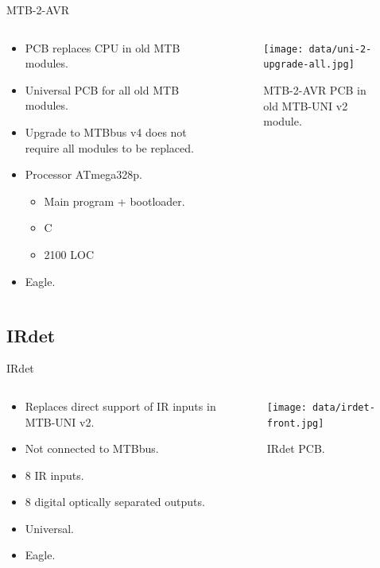\documentclass[aspectratio=169]{beamer}
\begin{document}
\begin{frame}{MTB-2-AVR}
\begin{columns}
	\begin{column}{.5\textwidth}
		\begin{itemize}
		\item PCB replaces CPU in old MTB modules.
		\item Universal PCB for all old MTB modules.
		\item Upgrade to MTBbus v4 does not require all modules to be replaced.
		\item Processor ATmega328p.
		\begin{itemize}
			\item Main program + bootloader.
			\item C
			\item 2100 LOC
		\end{itemize}
		\item Eagle.
		\end{itemize}
	\end{column}
	\begin{column}{.5\textwidth}
		\begin{figure}
		\texttt{[image: data/uni-2-upgrade-all.jpg]}
		\caption{MTB-2-AVR PCB in old MTB-UNI v2 module.}
		\end{figure}
	\end{column}
\end{columns}
\end{frame}


\subsection{IRdet}

\begin{frame}{IRdet}
\begin{columns}
	\begin{column}{.7\textwidth}
		\begin{itemize}
		\item Replaces direct support of IR inputs in MTB-UNI v2.
		\item Not connected to MTBbus.
		\item 8 IR inputs.
		\item 8 digital optically separated outputs.
		\item Universal.
		\item Eagle.
		\end{itemize}
	\end{column}
	\begin{column}{.3\textwidth}
		\begin{figure}
		\texttt{[image: data/irdet-front.jpg]}
		\caption{IRdet PCB.}
		\end{figure}
	\end{column}
\end{columns}
\end{frame}
\end{document}
